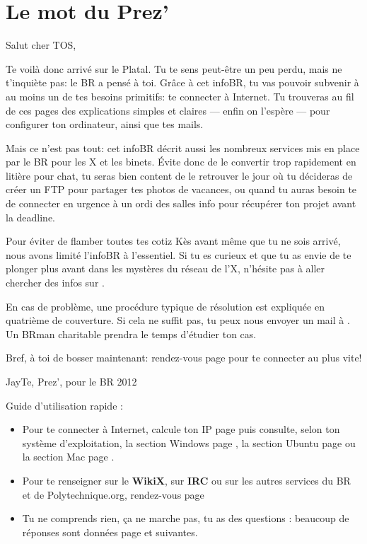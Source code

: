\thispagestyle{empty}

\section*{Le mot du Prez'}

\vspace{2em}

Salut cher TOS,
\vspace{1em}

Te voil\`a donc arriv\'e sur le Platal. Tu te sens peut-être un peu perdu, mais ne t'inqui\`ete pas: le BR a pens\'e \`a toi. Gr\^ace \`a cet infoBR, tu vas pouvoir subvenir \`a au moins un de tes besoins primitifs: te connecter \`a Internet. Tu trouveras au fil de ces pages des explications simples et claires --- enfin on l'esp\`ere --- pour configurer ton ordinateur, ainsi que tes mails.

Mais ce n'est pas tout: cet infoBR d\'ecrit aussi les nombreux services mis en place par le BR pour les X et les binets. \'Evite donc de le convertir trop rapidement en liti\`ere pour chat, tu seras bien content de le retrouver le jour o\`u tu d\'ecideras de cr\'eer un FTP pour partager tes photos de vacances, ou quand tu auras besoin te de connecter en urgence à un ordi des salles info pour r\'ecup\'erer ton projet avant la deadline.

Pour \'eviter de flamber toutes tes cotiz K\`es avant m\^eme que tu ne sois arriv\'e, nous avons limit\'e l'infoBR \`a l'essentiel. Si tu es curieux et que tu as envie de te plonger plus avant dans les myst\`eres du r\'eseau de l'X, n'h\'esite pas \`a aller chercher des infos sur .

\vspace{1em}
En cas de probl\`eme, une proc\'edure typique de r\'esolution est expliqu\'ee en quatri\`eme de couverture. Si cela ne suffit pas, tu peux nous envoyer un mail \`a . Un BRman charitable prendra le temps d'\'etudier ton cas.

Bref, \`a toi de bosser maintenant: rendez-vous page \pageref{ip} pour te connecter au plus vite!

\vspace{3em}
\hfill JayTe, Prez', pour le BR 2012


\vfill


Guide d'utilisation rapide :
\begin{itemize}
\item Pour te connecter \`a Internet, calcule ton IP page \pageref{ip} puis consulte, selon ton syst\`eme d'exploitation, la section Windows page \pageref{windows},
la section Ubuntu page \pageref{ubuntu} ou la section Mac page \pageref{mac}.
\item Pour te renseigner sur le \textbf{WikiX}, sur \textbf{IRC} ou sur les autres services du BR et de Polytechnique.org, rendez-vous page \pageref{services}
\item Tu ne comprends rien, \c{c}a ne marche pas, tu as des questions : beaucoup de r\'eponses sont donn\'ees page \pageref{faq} et suivantes.

\end{itemize}

